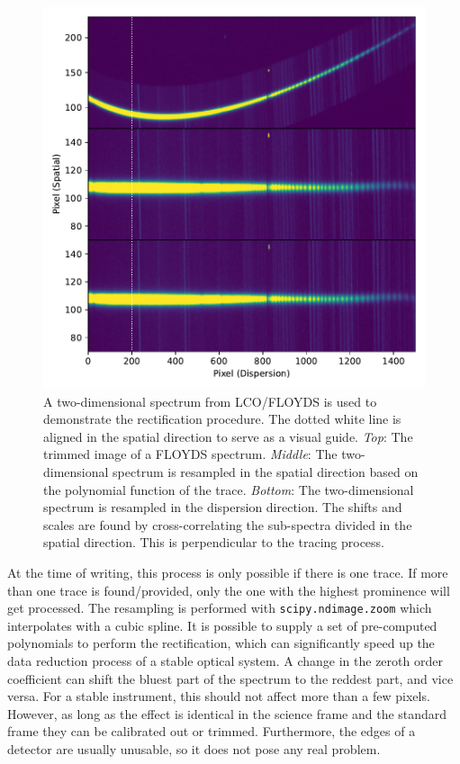 \documentclass[linenumbers, twocolumn]{aastex631}
\begin{document}
\begin{figure}
    \centering
    \includegraphics[width=\columnwidth]{fig_02_rectification.pdf}
    \caption{A two-dimensional spectrum from LCO/FLOYDS is used to demonstrate
    the rectification procedure. The dotted white line is aligned in the
    spatial direction to serve as a visual guide. \textit{Top}: The trimmed image of a
    FLOYDS spectrum. \textit{Middle}: The two-dimensional spectrum is resampled in the
    spatial direction based on the polynomial function of the trace. \textit{Bottom}:
    The two-dimensional spectrum is resampled in the dispersion direction. The
    shifts and scales are found by cross-correlating the sub-spectra divided in
    the spatial direction. This is perpendicular to the tracing process.}
    \label{fig:rectify}
\end{figure}

At the time of writing, this process is only possible if there is one trace. If
more than one trace is found/provided, only the one with the highest prominence
will get processed. The resampling is performed with \texttt{scipy.ndimage.zoom} 
which interpolates with a cubic spline. It is possible to supply a set of
pre-computed polynomials to perform the rectification, which can significantly
speed up the data reduction process of a stable optical system. A change in the 
zeroth order coefficient can shift the bluest part of the spectrum to the
reddest part, and vice versa. For a stable instrument, this should not affect more than a few pixels. However, as long as the effect is identical in the science
frame and the standard frame they can be calibrated out or trimmed. Furthermore,
the edges of a detector are usually unusable, so it does not pose any real
problem.
\end{document}
